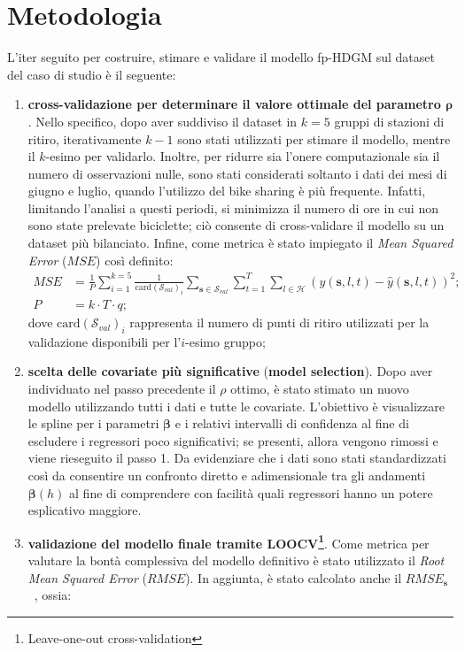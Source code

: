 \section{Metodologia}
L'iter seguito per costruire, stimare e validare il modello fp-HDGM sul dataset del caso di studio è il seguente:
\begin{enumerate}
	\item \textbf{cross-validazione per determinare il valore ottimale del parametro $\boldsymbol{\rho}$}. Nello specifico, dopo aver suddiviso il dataset in $k=5$ gruppi di stazioni di ritiro, iterativamente $k-1$ sono stati utilizzati per stimare il modello, mentre il $k$-esimo per validarlo. Inoltre, per ridurre sia l'onere computazionale sia il numero di osservazioni nulle, sono stati considerati soltanto i dati dei mesi di giugno e luglio, quando l'utilizzo del bike sharing è più frequente. Infatti, limitando l'analisi a questi periodi, si minimizza il numero di ore in cui non sono state prelevate biciclette; ciò consente di cross-validare il modello su un dataset più bilanciato. Infine, come metrica è stato impiegato il \textit{Mean Squared Error} ($MSE$) così definito:
	\begin{equation}
		\begin{aligned}
			MSE &= \frac{1}{P}\sum_{i=1}^{k=5}\frac{1}{\text{card}(\mathcal{S}_{val})_i}\sum_{\mathbf{s}\in\mathcal{S}_{val}}^{}\sum_{t=1}^{T}\sum_{l\in\mathcal{H}}^{} (y(\mathbf{s}, l, t) - \hat{y}(\mathbf{s}, l, t))^2; \\
			P &= k\cdot T\cdot q;
		\end{aligned}
	\end{equation}
	dove $\text{card}(\mathcal{S}_{val})_i$ rappresenta il numero di punti di ritiro utilizzati per la validazione disponibili per l'$i$-esimo gruppo;
	\item \textbf{scelta delle covariate più significative} (\textbf{model selection}). Dopo aver individuato nel passo precedente il $\rho$ ottimo, è stato stimato un nuovo modello utilizzando tutti i dati e tutte le covariate. L'obiettivo è visualizzare le spline per i parametri $\boldsymbol{\beta}$ e i relativi intervalli di confidenza al fine di escludere i regressori poco significativi; se presenti, allora vengono rimossi e viene rieseguito il passo \num{1}. Da evidenziare che i dati sono stati standardizzati così da consentire un confronto diretto e adimensionale tra gli andamenti $\boldsymbol{\beta}(h)$ al fine di comprendere con facilità quali regressori hanno un potere esplicativo maggiore.
	\item \textbf{validazione del modello finale tramite LOOCV\footnote{Leave-one-out cross-validation}}. Come metrica per valutare la bontà complessiva del modello definitivo è stato utilizzato il \textit{Root Mean Squared Error} ($RMSE$). In aggiunta, è stato calcolato anche il $RMSE_\mathbf{s}$~\citep{paper_f_HDGM}, ossia:

\end{enumerate}
